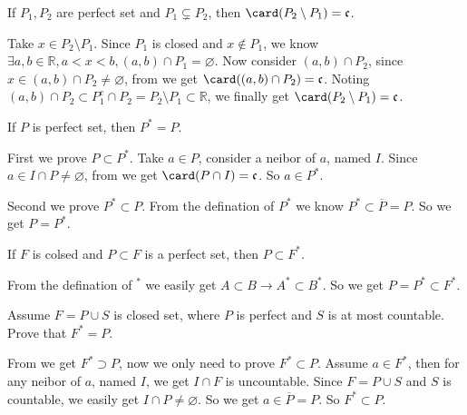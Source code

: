 \documentclass{ctexart}
\begin{document}
\begin{problem}\label{pro:6}
  If \(P_1,P_2\) are perfect set and \(P_1 \subsetneq P_2\), then \(\card(P_2\setminus P_1)=\mathfrak{c}\). 
\end{problem}

\begin{solution}
Take \(x \in P_2 \setminus P_1\). Since \(P_1\) is closed and \(x \notin P_1\), we know \(\exists a,b \in \mathbb{R},a<x<b,(a,b) \cap P_1 = \varnothing\). 
Now consider \((a,b) \cap P_{2}\), since \(x \in (a,b) \cap P_2 \neq \varnothing\), from  we get \(\card((a,b) \cap P_2)=\mathfrak{c}\). 
Noting \((a,b) \cap P_2 \subset P_1^{c} \cap P_2 = P_2 \setminus P_1 \subset \mathbb{R}\), we finally get \(\card(P_2 \setminus P_1)=\mathfrak{c}\). 
\end{solution}

\begin{problem}
  If \(P\) is perfect set, then \(P^{*}=P\). 
\end{problem}

\begin{solution}
  First we prove \(P \subset P^{*}\). Take \(a \in P\), consider a neibor of \(a\), named \(I\). 
  Since \(a \in I \cap P \neq \varnothing\), from  we get \(\card(P \cap I)=\mathfrak{c}\). 
  So \(a \in P^{*}\). 

  Second we prove \(P^{*} \subset P\). From the defination of \(P^{*}\) we know \(P^{*}\subset \overline{P} = P\). 
  So we get \(P = P^{*}\). 
\end{solution}

\begin{problem}\label{pro:4}
  If \(F\) is colsed and \(P \subset F\) is a perfect set, then \(P \subset F^{*}\). 
\end{problem}

\begin{solution}
  From the defination of \({}^{*}\) we easily get \(A \subset B \to A^{*} \subset B^{*}\). 
  So we get \(P = P^{*} \subset F^{*}\). 
\end{solution}

\begin{problem}\label{pro:5}
  Assume \(F=P \cup S\) is closed set, where \(P\) is perfect and \(S\) is at most countable. 
  Prove that \(F^{*}=P\). 
\end{problem}

\begin{solution}
  From  we get \(F^{*} \supset P\), now we only need to prove \(F^{*}\subset P\). 
  Assume \(a \in F^{*}\), then for any neibor of \(a\), named \(I\), we get \(I \cap F\) is uncountable. 
  Since \(F=P \cup S\) and \(S\) is countable, we easily get \(I \cap P \neq \varnothing\). 
  So we get \(a \in \overline{P}=P\). So \(F^{*} \subset P\). 
\end{solution}
\end{document}

